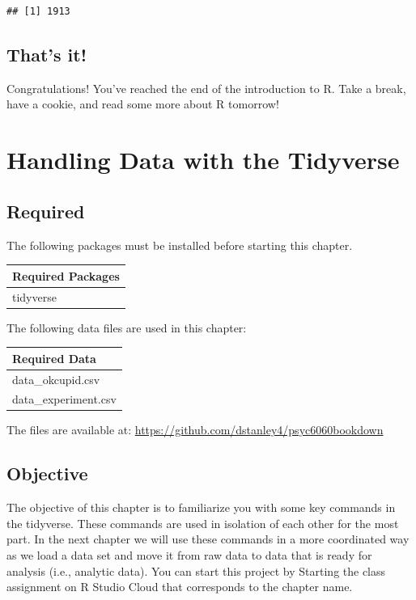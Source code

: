 \documentclass[
]{krantz}
\begin{document}
\begin{verbatim}
## [1] 1913
\end{verbatim}

\hypertarget{thats-it}{%
\section{That's it!}\label{thats-it}}

Congratulations! You've reached the end of the introduction to R. Take a break, have a cookie, and read some more about R tomorrow!

\hypertarget{handling-data-with-the-tidyverse}{%
\chapter{Handling Data with the Tidyverse}\label{handling-data-with-the-tidyverse}}

\hypertarget{required}{%
\section{Required}\label{required}}

The following packages must be installed before starting this chapter.

\begin{longtable}[]{@{}l@{}}
\toprule
Required Packages\tabularnewline
\midrule
\endhead
tidyverse\tabularnewline
\bottomrule
\end{longtable}

The following data files are used in this chapter:

\begin{longtable}[]{@{}l@{}}
\toprule
Required Data\tabularnewline
\midrule
\endhead
data\_okcupid.csv\tabularnewline
data\_experiment.csv\tabularnewline
\bottomrule
\end{longtable}

The files are available at: \url{https://github.com/dstanley4/psyc6060bookdown}

\hypertarget{objective}{%
\section{Objective}\label{objective}}

The objective of this chapter is to familiarize you with some key commands in the tidyverse. These commands are used in isolation of each other for the most part. In the next chapter we will use these commands in a more coordinated way as we load a data set and move it from raw data to data that is ready for analysis (i.e., analytic data). You can start this project by Starting the class assignment on R Studio Cloud that corresponds to the chapter name.
\end{document}

